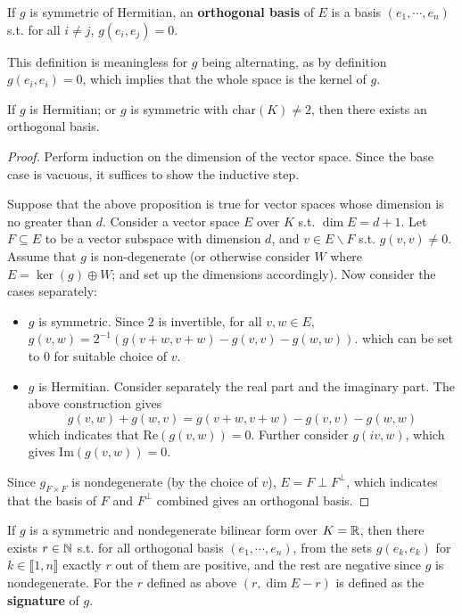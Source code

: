 \begin{definition}
    If $g$ is symmetric of Hermitian, an \textbf{orthogonal basis} of $E$ is a basis $(e_1, \cdots, e_n)$ s.t. for all $i \neq j$, $g(e_i, e_j) = 0$.
\end{definition}

\begin{remark}
    This definition is meaningless for $g$ being alternating, as by definition $g(e_i, e_i) = 0$, which implies that the whole space is the kernel of $g$.
\end{remark}

\begin{proposition}
    If $g$ is Hermitian; or $g$ is symmetric with $\text{char}(K) \neq 2$, then there exists an orthogonal basis.
\end{proposition}

\begin{proof}
    Perform induction on the dimension of the vector space. Since the base case is vacuous, it suffices to show the inductive step.

    Suppose that the above proposition is true for vector spaces whose dimension is no greater than $d$. Consider a vector space $E$ over $K$ s.t. $\dim E = d+1$. Let $F \subseteq E$ to be a vector subspace with dimension $d$, and $v \in E \smallsetminus F$ s.t. $g(v, v) \neq 0$. Assume that $g$ is non-degenerate (or otherwise consider $W$ where $E = \ker(g) \oplus W$; and set up the dimensions accordingly). Now consider the cases separately:
    \begin{itemize}
        \item $g$ is symmetric. Since $2$ is invertible, for all $v, w \in E$, $g(v, w) = 2^{-1}(g(v+w, v+w) - g(v, v) - g(w, w))$. which can be set to $0$ for suitable choice of $v$. 
        \item $g$ is Hermitian. Consider separately the real part and the imaginary part. The above construction gives
        \[
            g(v, w) + g(w, v) = g(v+w, v+w) - g(v, v) - g(w, w)
        \]
        which indicates that $\mathrm{Re}(g(v, w)) = 0$. Further consider $g(iv, w)$, which gives $\mathrm{Im}(g(v, w)) = 0$.
    \end{itemize}
    Since $g_{F\times F}$ is nondegenerate (by the choice of $v$), $E = F \perp F^{\perp}$, which indicates that the basis of $F$ and $F^{\perp}$ combined gives an orthogonal basis. 
\end{proof}

\begin{theorem}[Sylvester]
    If $g$ is a symmetric and nondegenerate bilinear form over $K = \mathbb{R}$, then there exists $r \in \mathbb{N}$ s.t. for all orthogonal basis $(e_1, \cdots, e_n)$, from the sets $g(e_k, e_k)$ for $k \in \llbracket 1, n \rrbracket$ exactly $r$ out of them are positive, and the rest are negative since $g$ is nondegenerate. For the $r$ defined as above $(r, \dim E - r)$ is defined as the \textbf{signature} of $g$.
\end{theorem}

